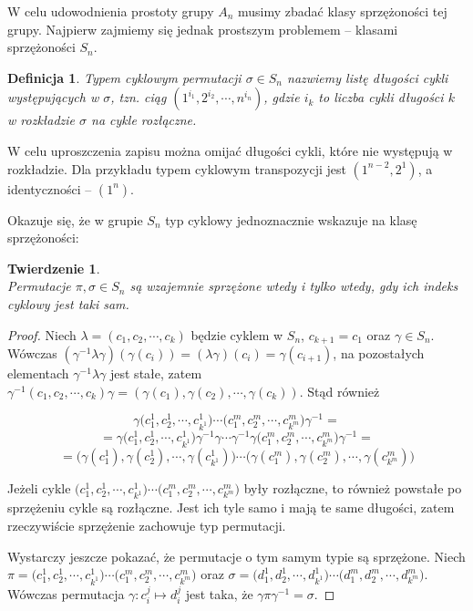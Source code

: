 \documentclass[licencjacka]{pracamgr}
\newtheorem{deff}{Definicja}[section]
\newtheorem{thh}{Twierdzenie}[section]
\begin{document}
W celu udowodnienia prostoty grupy $A_n$ musimy zbadać klasy sprzężoności tej grupy.
Najpierw zajmiemy się jednak prostszym problemem -- klasami sprzężoności $S_n$.

\begin{deff}
	\emph{Typem cyklowym} permutacji $\sigma \in S_n$ nazwiemy listę długości cykli występujących w $\sigma$,
	tzn. ciąg $(1^{i_1}, 2^{i_2}, \cdots, n^{i_n})$,
	gdzie $i_k$ to liczba cykli długości $k$ w rozkładzie $\sigma$ na cykle rozłączne.
\end{deff}
W celu uproszczenia zapisu można omijać długości cykli, które nie występują w rozkładzie.
Dla przykładu typem cyklowym transpozycji jest $(1^{n-2}, 2^1)$, a identyczności -- $(1^n)$.

Okazuje się, że w grupie $S_n$ typ cyklowy jednoznacznie wskazuje na klasę sprzężoności:

\begin{thh} $ $ \\
	Permutacje $\pi, \sigma \in S_n$ są wzajemnie sprzężone wtedy i tylko wtedy, gdy ich indeks cyklowy jest taki sam.
\end{thh}
\begin{proof}
	Niech $\lambda = (c_1, c_2, \cdots, c_k)$ będzie cyklem w $S_n$, $c_{k+1} = c_1$ oraz $\gamma \in S_n$.
	Wówczas $(\gamma^{-1} \lambda \gamma)(\gamma(c_i)) = (\lambda \gamma)(c_i) = \gamma(c_{i+1})$,
	na pozostałych elementach $\gamma^{-1} \lambda \gamma$ jest stałe, 
	zatem $\gamma^{-1} (c_1, c_2, \cdots, c_k) \gamma = (\gamma(c_1), \gamma(c_2), \cdots, \gamma(c_k))$.
	Stąd również 

		$$\gamma \Big(c_1^1, c_2^1, \cdots, c_{k^1}^1\Big) \cdots \Big(c_1^m, c_2^m, \cdots, c_{k^m}^m \Big) \gamma^{-1} = $$
		$$ = \gamma \Big(c_1^1, c_2^1, \cdots, c_{k^1}^1\Big) \gamma^{-1} \gamma  \cdots \gamma ^{-1} \gamma \Big(c_1^m, c_2^m, \cdots, c_{k^m}^m\Big) \gamma^{-1} = $$
		$$ = \Big(\gamma (c_1^1), \gamma (c_2^1), \cdots, \gamma (c_{k^1}^1)\Big) \cdots \Big(\gamma (c_1^m), \gamma (c_2^m), \cdots, \gamma (c_{k^m}^m)\Big)$$

	Jeżeli cykle $\Big(c_1^1, c_2^1, \cdots, c_{k^1}^1\Big) \cdots \Big(c_1^m, c_2^m, \cdots, c_{k^m}^m \Big)$ były rozłączne,
	to również powstałe po sprzężeniu cykle są rozłączne.
	Jest ich tyle samo i mają te same długości, zatem rzeczywiście sprzężenie zachowuje typ permutacji.

	Wystarczy jeszcze pokazać, że permutacje o tym samym typie są sprzężone.
	Niech $\pi =    \Big(c_1^1, c_2^1, \cdots, c_{k^1}^1\Big) \cdots \Big(c_1^m, c_2^m, \cdots, c_{k^m}^m \Big)$ 
	oraz  $\sigma = \Big(d_1^1, d_2^1, \cdots, d_{k^1}^1\Big) \cdots \Big(d_1^m, d_2^m, \cdots, d_{k^m}^m \Big)$.
	Wówczas permutacja $\gamma \colon c_i^j \mapsto d_i^j$ jest taka, że $\gamma \pi \gamma^{-1} = \sigma$.
\end{proof}
\end{document}
